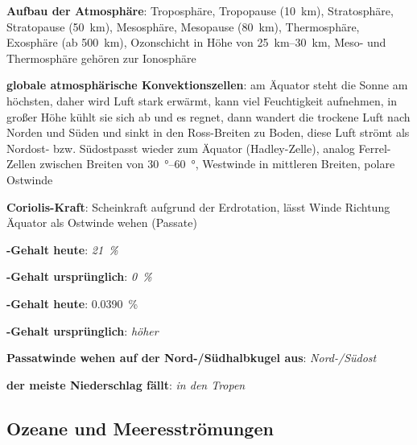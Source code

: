 \textbf{Aufbau der Atmosphäre}:
Troposphäre,
Tropopause (\SI{10}{\kilo\meter}),
Stratosphäre,\\
Stratopause (\SI{50}{\kilo\meter}),
Mesosphäre,
Mesopause (\SI{80}{\kilo\meter}),
Thermosphäre,
Exosphäre (ab \SI{500}{\kilo\meter}),
Ozonschicht in Höhe von \SIrange{25}{30}{\kilo\meter},
Meso- und Thermosphäre gehören zur Ionosphäre

\textbf{globale atmosphärische Konvektionszellen}:
am Äquator steht die Sonne am höchsten, daher wird Luft stark erwärmt,
kann viel Feuchtigkeit aufnehmen,
in großer Höhe kühlt sie sich ab und es regnet,
dann wandert die trockene Luft nach Norden und Süden und sinkt in den Ross-Breiten zu Boden,
diese Luft strömt als Nordost- bzw. Südostpasst wieder zum Äquator (Hadley-Zelle),
analog Ferrel-Zellen zwischen Breiten von \SIrange{30}{60}{\degree},
Westwinde in mittleren Breiten,
polare Ostwinde

\textbf{Coriolis-Kraft}:
Scheinkraft aufgrund der Erdrotation,
lässt Winde Richtung Äquator als Ostwinde wehen (Passate)

\begin{wichtig}
    \item
    \textbf{-Gehalt heute}:
    \emph{\SI[math-rm=\mathit,text-rm=\itshape]{21}{\percent}} 
    
    \item
    \textbf{-Gehalt ursprünglich}:
    \emph{\SI[math-rm=\mathit,text-rm=\itshape]{0}{\percent}}
    
    \item
    \textbf{-Gehalt heute}:
    \SI[math-rm=\mathit,text-rm=\itshape]{0.0390}{\percent}
    
    \item
    \textbf{-Gehalt ursprünglich}:
    \emph{höher}
    
    \item
    \textbf{Passatwinde wehen auf der Nord-/Südhalbkugel aus}:
    \emph{Nord-/Südost}
    
    \item
    \textbf{der meiste Niederschlag fällt}:
    \emph{in den Tropen}
\end{wichtig}

\pagebreak

\subsection{%
    Ozeane und Meeresströmungen%
}

